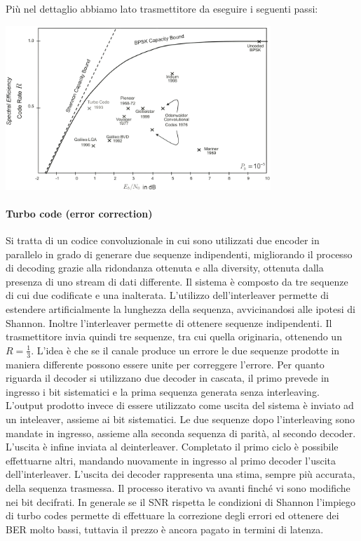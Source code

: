 Più nel dettaglio abbiamo lato trasmettitore da eseguire i seguenti passi:

\begin{center}
    \includegraphics[width=0.75\textwidth]{imgs/codes_and_shannon_bound.png}
\end{center}
\paragraph*{Turbo code (error correction)}

Si tratta di un codice convoluzionale in cui sono utilizzati due encoder in parallelo in grado di generare due sequenze indipendenti, migliorando il processo di decoding grazie alla ridondanza ottenuta e alla diversity, ottenuta dalla presenza di uno stream di dati differente.
Il sistema è composto da tre sequenze di cui due codificate e una inalterata. L'utilizzo dell'interleaver permette di estendere artificialmente la lunghezza della sequenza, avvicinandosi alle ipotesi di Shannon. Inoltre l'interleaver permette di ottenere sequenze indipendenti. 
Il trasmettitore invia quindi tre sequenze, tra cui quella originaria, ottenendo un $R=\frac{1}{3}$. L'idea è che se il canale produce un errore le due sequenze prodotte in maniera differente possono essere unite  per correggere l'errore.
Per quanto riguarda il decoder si utilizzano due decoder in cascata, il primo prevede in ingresso i bit sistematici e la prima sequenza generata senza interleaving. L'output prodotto invece di essere utilizzato come uscita del sistema è inviato ad un inteleaver, assieme ai bit sistematici. 
Le due sequenze dopo l'interleaving sono mandate in ingresso, assieme alla seconda sequenza di parità, al secondo decoder. L'uscita è infine inviata al deinterleaver. 
Completato il primo ciclo è possibile effettuarne altri, mandando nuovamente in ingresso al primo decoder l'uscita dell'interleaver. 
L'uscita dei decoder rappresenta una stima, sempre più accurata, della sequenza trasmessa. Il processo iterativo va avanti finché vi sono modifiche nei bit decifrati.
In generale se il SNR rispetta le condizioni di Shannon l'impiego di turbo codes permette di effettuare la correzione degli errori ed ottenere dei BER molto bassi, tuttavia il prezzo è ancora pagato in termini di latenza.






